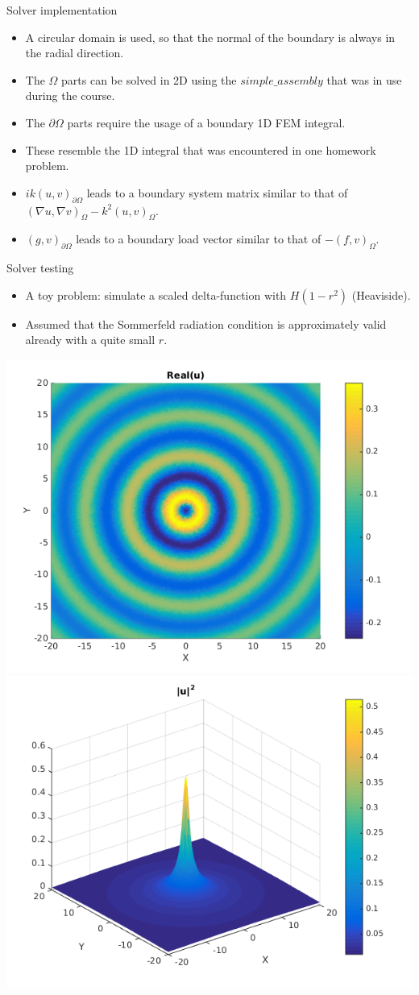 \documentclass{beamer}
\begin{document}
\begin{frame}{Solver implementation}
 
\begin{itemize}
 \item A circular domain is used, so that the normal of the boundary is always in the radial direction.
 \item The $\Omega$ parts can be solved in 2D using the $simple\_assembly$ that was in use during the course.
 \item The $\partial \Omega$ parts require the usage of a boundary 1D FEM integral.
 \item These resemble the 1D integral that was encountered in one homework problem.
 \item $ik(u, v)_{\partial \Omega}$ leads to a boundary system matrix similar to that of $(\nabla u, \nabla v)_{\Omega} - k^2(u, v)_{\Omega}$.
 \item $(g, v)_{\partial \Omega}$ leads to a boundary load vector similar to that of $-(f, v)_{\Omega}$.
\end{itemize}

\end{frame}

\begin{frame}{Solver testing}
\begin{itemize}
 \item A toy problem: simulate a scaled delta-function with $H(1-r^2)$ (Heaviside).
 \item Assumed that the Sommerfeld radiation condition is approximately valid already with a quite small $r$.
\end{itemize}
 \begin{center}
\includegraphics[width=.5\textwidth]{delta_real.png}%
\includegraphics[width=.5\textwidth]{delta_abs2.png}
\end{center}
\end{frame}
\end{document}
